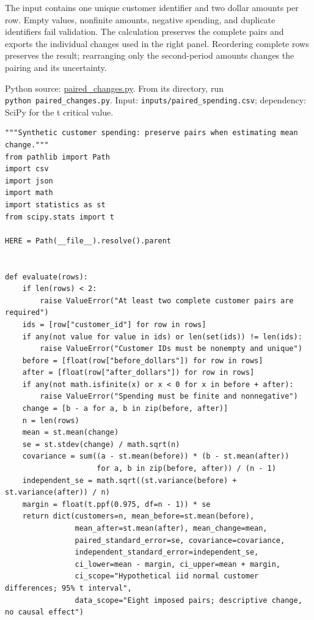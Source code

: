 \noindent \noindent The input contains one unique customer identifier and two
dollar amounts per row. Empty values, nonfinite amounts, negative
spending, and duplicate identifiers fail validation. The calculation
preserves the complete pairs and exports the individual changes used in
the right panel. Reordering complete rows preserves the result;
rearranging only the second-period amounts changes the pairing and its
uncertainty.

\FloatBarrier
{}
Python source:
\href{../03_Data_and_Code/Statistical_Graphics/paired_changes.py}{paired\_changes.py}.
From its directory, run \texttt{python\ paired\_changes.py}. Input:
\texttt{inputs/paired\_spending.csv}; dependency: SciPy for the t
critical value.

\begin{Verbatim}[breaklines,breakanywhere,fontsize=\small]
"""Synthetic customer spending: preserve pairs when estimating mean change."""
from pathlib import Path
import csv
import json
import math
import statistics as st
from scipy.stats import t

HERE = Path(__file__).resolve().parent


def evaluate(rows):
    if len(rows) < 2:
        raise ValueError("At least two complete customer pairs are required")
    ids = [row["customer_id"] for row in rows]
    if any(not value for value in ids) or len(set(ids)) != len(ids):
        raise ValueError("Customer IDs must be nonempty and unique")
    before = [float(row["before_dollars"]) for row in rows]
    after = [float(row["after_dollars"]) for row in rows]
    if any(not math.isfinite(x) or x < 0 for x in before + after):
        raise ValueError("Spending must be finite and nonnegative")
    change = [b - a for a, b in zip(before, after)]
    n = len(rows)
    mean = st.mean(change)
    se = st.stdev(change) / math.sqrt(n)
    covariance = sum((a - st.mean(before)) * (b - st.mean(after))
                     for a, b in zip(before, after)) / (n - 1)
    independent_se = math.sqrt((st.variance(before) + st.variance(after)) / n)
    margin = float(t.ppf(0.975, df=n - 1)) * se
    return dict(customers=n, mean_before=st.mean(before),
                mean_after=st.mean(after), mean_change=mean,
                paired_standard_error=se, covariance=covariance,
                independent_standard_error=independent_se,
                ci_lower=mean - margin, ci_upper=mean + margin,
                ci_scope="Hypothetical iid normal customer differences; 95% t interval",
                data_scope="Eight imposed pairs; descriptive change, no causal effect")



\end{Verbatim}
